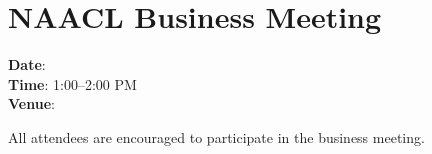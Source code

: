 \section[NAACL Business Meeting]{NAACL Business Meeting}
\thispagestyle{emptyheader}

\textbf{Date}: \daydateyear \\
\textbf{Time}: 1:00--2:00 PM \\
\textbf{Venue}: \BusinessMeetingLoc

All attendees are encouraged to participate in the business
meeting. 


